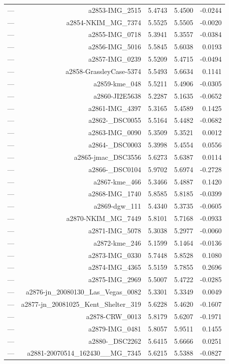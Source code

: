 \begin{table}[htbp]
\begin{tabular}{lrrrr}
— & a2853-IMG_2515 & 5.4743 & 5.4500 & -0.0244 \\
— & a2854-NKIM_MG_7374 & 5.5525 & 5.5505 & -0.0020 \\
— & a2855-IMG_0718 & 5.3941 & 5.3557 & -0.0384 \\
— & a2856-IMG_5016 & 5.5845 & 5.6038 & 0.0193 \\
— & a2857-IMG_0239 & 5.5209 & 5.4715 & -0.0494 \\
— & a2858-GrassleyCase-5374 & 5.5493 & 5.6634 & 0.1141 \\
— & a2859-kme_048 & 5.5211 & 5.4906 & -0.0305 \\
— & a2860-JI2E5638 & 5.2287 & 5.1635 & -0.0652 \\
— & a2861-IMG_4397 & 5.3165 & 5.4589 & 0.1425 \\
— & a2862-_DSC0055 & 5.5164 & 5.4482 & -0.0682 \\
— & a2863-IMG_0090 & 5.3509 & 5.3521 & 0.0012 \\
— & a2864-_DSC0003 & 5.3998 & 5.4554 & 0.0556 \\
— & a2865-jmac_DSC3556 & 5.6273 & 5.6387 & 0.0114 \\
— & a2866-_DSC0104 & 5.9702 & 5.6974 & -0.2728 \\
— & a2867-kme_466 & 5.3466 & 5.4887 & 0.1420 \\
— & a2868-IMG_1740 & 5.8585 & 5.8185 & -0.0399 \\
— & a2869-dgw_111 & 5.4340 & 5.3735 & -0.0605 \\
— & a2870-NKIM_MG_7449 & 5.8101 & 5.7168 & -0.0933 \\
— & a2871-IMG_5078 & 5.3038 & 5.2977 & -0.0060 \\
— & a2872-kme_246 & 5.1599 & 5.1464 & -0.0136 \\
— & a2873-IMG_0330 & 5.7448 & 5.8528 & 0.1080 \\
— & a2874-IMG_4365 & 5.5159 & 5.7855 & 0.2696 \\
— & a2875-IMG_2969 & 5.5007 & 5.4722 & -0.0285 \\
— & a2876-jn_20080130_Las_Vegas_0082 & 5.3301 & 5.3349 & 0.0049 \\
— & a2877-jn_20081025_Kent_Shelter_319 & 5.6228 & 5.4620 & -0.1607 \\
— & a2878-CRW_0013 & 5.8179 & 5.6207 & -0.1971 \\
— & a2879-IMG_0481 & 5.8057 & 5.9511 & 0.1455 \\
— & a2880-_DSC2262 & 5.6415 & 5.6666 & 0.0251 \\
— & a2881-20070514_162430__MG_7345 & 5.6215 & 5.5388 & -0.0827 \\

\end{tabular}
\end{table}

